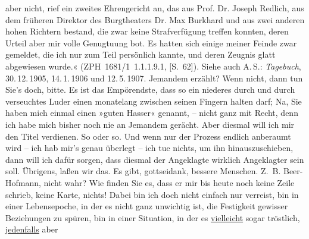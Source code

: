 \begin{ledgroupsized}[t]{13cm}
{{{                     aber nicht, rief ein zweites Ehrengericht an, das aus Prof. Dr. Joseph Redlich, aus dem früheren Direktor
                     des Burgtheaters Dr. Max Burkhard und aus zwei anderen hohen Richtern
                     bestand, die zwar keine Strafverfügung treffen konnten, deren Urteil aber mir
                     volle Genugtuung bot. Es hatten sich einige meiner Feinde zwar gemeldet, die
                     ich nur zum Teil persönlich kannte, und deren Zeugnis glatt abgewiesen
                     wurde.« (ZPH 1681/1 1.1.1.9.1, [S. 62]). Siehe auch A. S.: \emph{Tagebuch}, 30. 12. 1905, 14. 1. 1906 und 12. 5. 1907.}}}\label{K_L03415-6h}
               Jemandem erzählt? Wenn nicht, dann tun Sie’s doch, bitte. Es ist das Empörendste,
               dass so ein niederes {\pb}durch und
               durch verseuchtes Luder einen monatelang zwischen seinen Fingern halten darf; Na, Sie
               haben mich einmal einen »guten Hasser« genannt, – nicht ganz mit Recht, denn ich habe
               mich bisher noch nie an Jemandem gerächt. Aber diesmal will ich mir den Titel
               verdienen. So oder so. Und wenn nur der Prozess endlich anberaumt wird – ich hab
               mir’s genau überlegt – ich tue nichts, um ihn hinauszuschieben, dann will ich dafür
               sorgen, dass diesmal der Angeklagte wirklich Angeklagter sein soll.\pend
           \pstart
           Übrigens, laßen wir das. Es gibt, gottseidank, bessere Menschen. Z. B. Beer-Hofmann, nicht wahr? Wie finden Sie es,
               dass er mir bis heute noch keine Zeile schrieb, keine
               Karte, nichts! Dabei bin ich doch nicht einfach nur verreist, bin in einer
               Lebensepoche, in der es nicht ganz unwichtig ist, die Festigkeit gewisser Beziehungen
               zu spüren, bin in einer Situation, in der es \uline{vielleicht} sogar tröstlich, \uline{jedenfalls} aber

\end{ledgroupsized}
